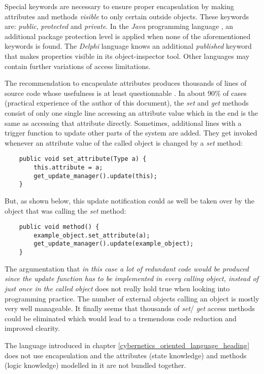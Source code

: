 Special keywords are necessary to ensure proper encapsulation by making
attributes and methods \emph{visible} to only certain outside objects. These
keywords are: \emph{public}, \emph{protected} and \emph{private}. In the
\emph{Java} programming language \cite{java}, an additional package protection
level is applied when none of the aforementioned keywords is found. The
\emph{Delphi} language \cite{warken} knows an additional \emph{published}
keyword that makes properties visible in its object-inspector tool. Other
languages may contain further variations of access limitations.

The recommendation to encapsulate attributes produces thousands of lines of
source code whose usefulness is at least questionnable \cite{hellerbohl}. In
about 90\% of cases (practical experience of the author of this document), the
\emph{set} and \emph{get} methods consist of only one single line accessing an
attribute value which in the end is the same as accessing that attribute
directly. Sometimes, additional lines with a trigger function to update other
parts of the system are added. They get invoked whenever an attribute value of
the called object is changed by a \emph{set} method:

\begin{scriptsize}
    \begin{verbatim}
    public void set_attribute(Type a) {
        this.attribute = a;
        get_update_manager().update(this);
    }
    \end{verbatim}
\end{scriptsize}

But, as shown below, this update notification could as well be taken over by
the object that was calling the \emph{set} method:

\begin{scriptsize}
    \begin{verbatim}
    public void method() {
        example_object.set_attribute(a);
        get_update_manager().update(example_object);
    }
    \end{verbatim}
\end{scriptsize}

The argumentation that \textit{in this case a lot of redundant code would be
produced since the update function has to be implemented in every calling
object, instead of just once in the called object} does not really hold true
when looking into programming practice. The number of external objects calling
an object is mostly very well manageable. It finally seems that thousands of
\emph{set}/ \emph{get} access methods could be eliminated which would lead to a
tremendous code reduction and improved clearity.

The language introduced in chapter \ref{cybernetics_oriented_language_heading}
does not use encapsulation and the attributes (state knowledge) and methods
(logic knowledge) modelled in it are not bundled together.
